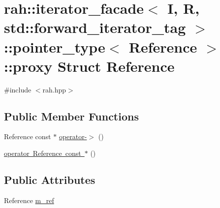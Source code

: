 \hypertarget{structrah_1_1iterator__facade_3_01_i_00_01_r_00_01std_1_1forward__iterator__tag_01_4_1_1pointer__type_1_1proxy}{}\section{rah\+::iterator\+\_\+facade$<$ I, R, std\+::forward\+\_\+iterator\+\_\+tag $>$\+::pointer\+\_\+type$<$ Reference $>$\+::proxy Struct Reference}
\label{structrah_1_1iterator__facade_3_01_i_00_01_r_00_01std_1_1forward__iterator__tag_01_4_1_1pointer__type_1_1proxy}


{\ttfamily \#include $<$rah.\+hpp$>$}

\subsection*{Public Member Functions}
\begin{DoxyCompactItemize}
\item 
Reference const  $\ast$ \mbox{\hyperlink{structrah_1_1iterator__facade_3_01_i_00_01_r_00_01std_1_1forward__iterator__tag_01_4_1_1pointer__type_1_1proxy_abc11e6f8fe21b3045765f1f3cc0d61ae}{operator-\/$>$}} ()
\item 
\mbox{\hyperlink{structrah_1_1iterator__facade_3_01_i_00_01_r_00_01std_1_1forward__iterator__tag_01_4_1_1pointer__type_1_1proxy_a7a85814c60204b2ed2def8f2d8a7d705}{operator Reference const $\ast$}} ()
\end{DoxyCompactItemize}
\subsection*{Public Attributes}
\begin{DoxyCompactItemize}
\item 
Reference \mbox{\hyperlink{structrah_1_1iterator__facade_3_01_i_00_01_r_00_01std_1_1forward__iterator__tag_01_4_1_1pointer__type_1_1proxy_a5312ff831890ba9940f5aac7f84ecbae}{m\+\_\+ref}}
\end{DoxyCompactItemize}


